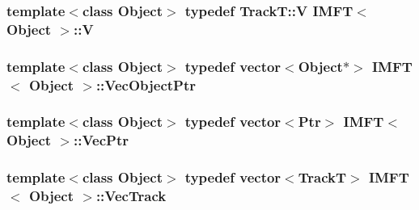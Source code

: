 \hypertarget{class_i_m_f_t_ad22184fa80718f8e5087d8cec78a6323}{
\subsubsection[{\-V}]{\setlength{\rightskip}{0pt plus 5cm}template$<$class \-Object$>$ typedef {\bf \-Track\-T\-::\-V} {\bf \-I\-M\-F\-T}$<$ \-Object $>$\-::{\bf \-V}}}\label{class_i_m_f_t_ad22184fa80718f8e5087d8cec78a6323}
\hypertarget{class_i_m_f_t_a03dc658b57ff8debb2b6869be37c0d67}{
\subsubsection[{\-Vec\-Object\-Ptr}]{\setlength{\rightskip}{0pt plus 5cm}template$<$class \-Object$>$ typedef vector$<$\-Object$\ast$$>$ {\bf \-I\-M\-F\-T}$<$ \-Object $>$\-::{\bf \-Vec\-Object\-Ptr}}}\label{class_i_m_f_t_a03dc658b57ff8debb2b6869be37c0d67}
\hypertarget{class_i_m_f_t_a47e5af5b3e023928bd7ddc6ddbf6044c}{
\subsubsection[{\-Vec\-Ptr}]{\setlength{\rightskip}{0pt plus 5cm}template$<$class \-Object$>$ typedef vector$<${\bf \-Ptr}$>$ {\bf \-I\-M\-F\-T}$<$ \-Object $>$\-::{\bf \-Vec\-Ptr}}}\label{class_i_m_f_t_a47e5af5b3e023928bd7ddc6ddbf6044c}
\hypertarget{class_i_m_f_t_a55e4fd327687c579749d3ca13e0f621e}{
\subsubsection[{\-Vec\-Track}]{\setlength{\rightskip}{0pt plus 5cm}template$<$class \-Object$>$ typedef vector$<${\bf \-Track\-T}$>$ {\bf \-I\-M\-F\-T}$<$ \-Object $>$\-::{\bf \-Vec\-Track}}}\label{class_i_m_f_t_a55e4fd327687c579749d3ca13e0f621e}


